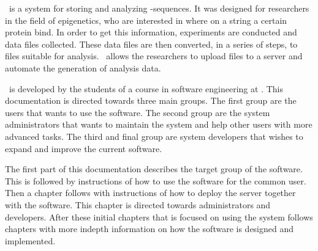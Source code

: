 

\appName\ is a system for storing and analyzing -sequences. It was designed for researchers in the field of epigenetics, who are interested in where on a  string a certain protein bind. In order to get this information, experiments are conducted and  data files collected. These data files are then converted, in a series of steps, to files suitable for analysis. \appName\ allows the researchers to upload  files to a server and automate the generation of analysis data. 

\appName\ is developed by the students of a course in software engineering at . This documentation is directed towards three main groups. The first group are the users that wants to use the software. The second group are the system administrators that wants to maintain the system and help other users with more advanced tasks. The third and final group are system developers that wishes to expand and improve the current software.

The first part of this documentation describes the target group of the software. This is followed by instructions of how to use the software for the common user. Then a chapter follows with instructions of how to deploy the server together with the software. This chapter is directed towards administrators and developers. After these initial chapters that is focused on using the system follows chapters with more indepth information on how the software is designed and implemented. 

